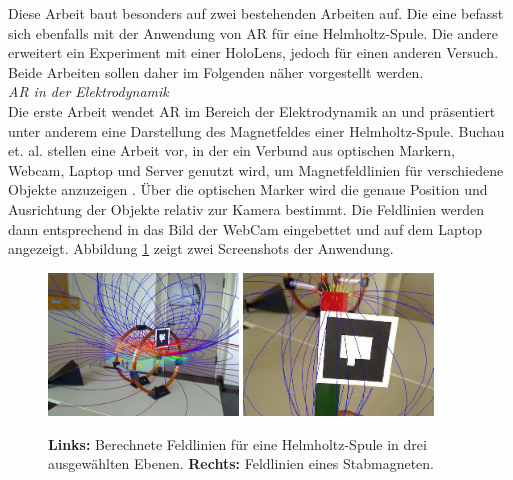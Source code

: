 Diese Arbeit baut besonders auf zwei bestehenden Arbeiten auf. Die eine befasst sich ebenfalls mit der Anwendung von AR für eine Helmholtz-Spule. Die andere erweitert ein Experiment mit einer HoloLens, jedoch für einen anderen Versuch. Beide Arbeiten sollen daher im Folgenden näher vorgestellt werden.\\

\vspace{4px}
\textit{AR in der Elektrodynamik}\\
Die erste Arbeit wendet AR im Bereich der Elektrodynamik an und präsentiert unter anderem eine Darstellung des Magnetfeldes einer Helmholtz-Spule. Buchau et. al. stellen eine Arbeit vor, in der ein Verbund aus optischen Markern, Webcam, Laptop und Server genutzt wird, um Magnetfeldlinien für verschiedene Objekte anzuzeigen \cite{Buchau09}. Über die optischen Marker wird die genaue Position und Ausrichtung der Objekte relativ zur Kamera bestimmt. Die Feldlinien werden dann entsprechend in das Bild der WebCam eingebettet und auf dem Laptop angezeigt. Abbildung \ref{img:buchau} zeigt zwei Screenshots der Anwendung.\\

\begin{figure}[h!]
	\centering
	\includegraphics[width=0.45\textwidth]{images/papers/Buchau09.jpg}
	\hspace{0.05cm}
	\includegraphics[width=0.45\textwidth]{images/papers/Buchau09_Magnet_2.jpg}
	\caption{\textbf{Links:} Berechnete Feldlinien für eine Helmholtz-Spule in drei ausgewählten Ebenen. \textbf{Rechts: } Feldlinien eines Stabmagneten.\cite{Buchau09}}
	\label{img:buchau}
\end{figure}

